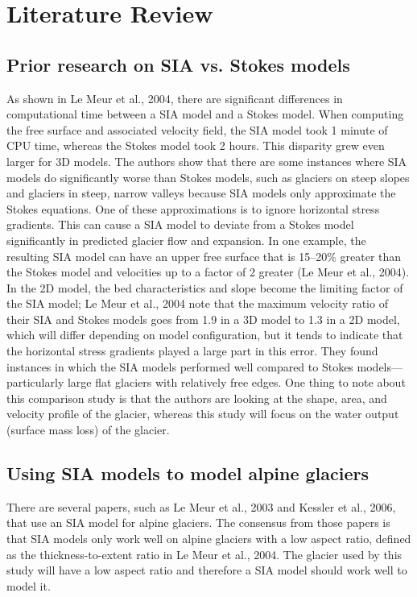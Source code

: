 \documentclass{article}
\begin{document}
\section{Literature Review}
\subsection{Prior research on SIA vs. Stokes models}
    As shown in Le Meur et al., 2004, there are significant differences in computational time between a SIA model and a Stokes model. When 
computing the free surface and associated velocity field, the SIA model took 1 minute of CPU time, whereas the Stokes model took 2 hours. 
This disparity grew even larger for 3D models. The authors show that there are some instances where SIA models do significantly worse than 
Stokes models, such as glaciers on steep slopes and glaciers in steep, narrow valleys because SIA models only approximate the Stokes 
equations. One of these approximations is to ignore horizontal stress gradients. This can cause a SIA model to deviate from a Stokes model 
significantly in predicted glacier flow and expansion. In one example, the resulting SIA model can have an upper free surface that is 
15--20\% greater than the Stokes model and velocities up to a factor of 2 greater (Le Meur et al., 2004). In the 2D model, the bed 
characteristics and slope become the limiting factor of the SIA model; Le Meur et al., 2004 note that the maximum velocity ratio of their 
SIA and Stokes models goes from 1.9 in a 3D model to 1.3 in a 2D model, which will differ depending on model configuration, but it tends to 
indicate that the horizontal stress gradients played a large part in this error. They found instances in which the SIA models performed well 
compared to Stokes models---particularly large flat glaciers with relatively free edges. One thing to note about this comparison study is 
that the authors are looking at the shape, area, and velocity profile of the glacier, whereas this study will focus on the water output 
(surface mass loss) of the glacier.
\subsection{Using SIA models to model alpine glaciers}
    There are several papers, such as Le Meur et al., 2003 and Kessler et al., 2006, that use an SIA model for alpine glaciers. The consensus 
from those papers is that SIA models only work well on alpine glaciers with a low aspect ratio, defined as the thickness-to-extent ratio in 
Le Meur et al., 2004. The glacier used by this study will have a low aspect ratio and therefore a SIA model should work well to model it.
\end{document}
